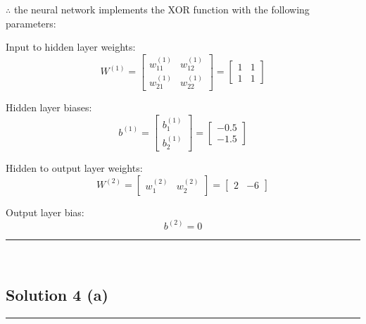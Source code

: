 \documentclass{article}
\begin{document}
\subsubsection*{\normalfont}{$\therefore$ the neural network implements the XOR function with the following parameters:}\\

\parbox{\textwidth}{

Input to hidden layer weights:\\

$$W^{(1)} = \begin{bmatrix} w_{11}^{(1)} & w_{12}^{(1)} \\ w_{21}^{(1)} & w_{22}^{(1)} \end{bmatrix} = \begin{bmatrix} 1 & 1 \\ 1 & 1 \end{bmatrix}$$

Hidden layer biases:\\
$$b^{(1)} = \begin{bmatrix} b_1^{(1)} \\ b_2^{(1)} \end{bmatrix} = \begin{bmatrix} -0.5 \\ -1.5 \end{bmatrix}$$

Hidden to output layer weights:\\
$$W^{(2)} = \begin{bmatrix} w_{1}^{(2)} & w_{2}^{(2)} \end{bmatrix} = \begin{bmatrix} 2 & -6 \end{bmatrix}$$

Output layer bias:\\
$$b^{(2)} = 0$$

}


\noindent\rule{\textwidth}{0.4pt}\\

\newpage

\subsection*{Solution 4 (a)}
\noindent\rule{\textwidth}{0.4pt}\\
\end{document}

